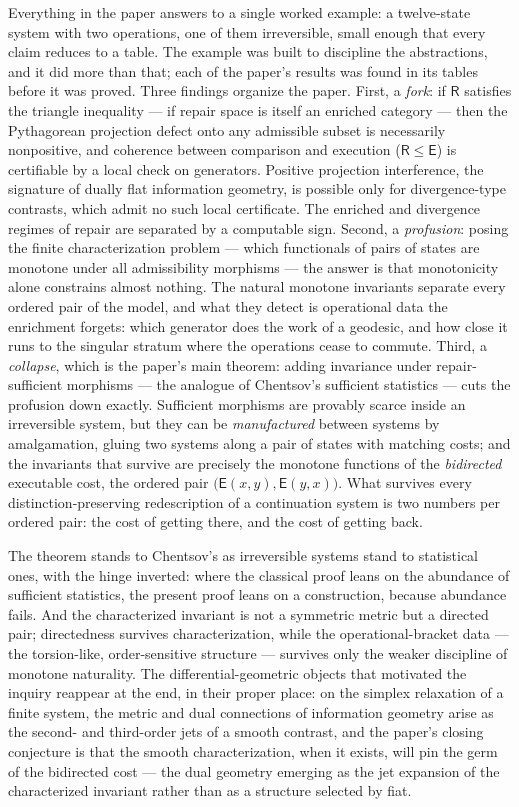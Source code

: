\documentclass[11pt]{article}
\theoremstyle{remark}
\newcommand{\R}{\mathsf{R}}
\newcommand{\E}{\mathsf{E}}
\begin{document}
Everything in the paper answers to a single worked example: a
twelve-state system with two operations, one of them irreversible,
small enough that every claim reduces to a table. The example was
built to discipline the abstractions, and it did more than that; each
of the paper's results was found in its tables before it was proved.
Three findings organize the paper. First, a \emph{fork}: if $\R$
satisfies the triangle inequality --- if repair space is itself an
enriched category --- then the Pythagorean projection defect onto any
admissible subset is necessarily nonpositive, and coherence between
comparison and execution ($\R\le\E$) is certifiable by a local check
on generators. Positive projection interference, the signature of
dually flat information geometry, is possible only for
divergence-type contrasts, which admit no such local certificate.
The enriched and divergence regimes of repair are separated by a
computable sign. Second, a \emph{profusion}: posing the finite
characterization problem --- which functionals of pairs of states are
monotone under all admissibility morphisms --- the answer is that
monotonicity alone constrains almost nothing. The natural monotone
invariants separate every ordered pair of the model, and what they
detect is operational data the enrichment forgets: which generator
does the work of a geodesic, and how close it runs to the singular
stratum where the operations cease to commute. Third, a
\emph{collapse}, which is the paper's main theorem: adding invariance
under repair-sufficient morphisms --- the analogue of Chentsov's
sufficient statistics --- cuts the profusion down exactly. Sufficient
morphisms are provably scarce inside an irreversible system, but they
can be \emph{manufactured} between systems by amalgamation, gluing
two systems along a pair of states with matching costs; and the
invariants that survive are precisely the monotone functions of the
\emph{bidirected} executable cost, the ordered pair
$\bigl(\E(x,y),\E(y,x)\bigr)$. What survives every
distinction-preserving redescription of a continuation system is two
numbers per ordered pair: the cost of getting there, and the cost of
getting back.

The theorem stands to Chentsov's as irreversible systems stand to
statistical ones, with the hinge inverted: where the classical proof
leans on the abundance of sufficient statistics, the present proof
leans on a construction, because abundance fails. And the
characterized invariant is not a symmetric metric but a directed
pair; directedness survives characterization, while the
operational-bracket data --- the torsion-like, order-sensitive
structure --- survives only the weaker discipline of monotone
naturality. The differential-geometric objects that motivated the
inquiry reappear at the end, in their proper place: on the simplex
relaxation of a finite system, the metric and dual connections of
information geometry arise as the second- and third-order jets of a
smooth contrast, and the paper's closing conjecture is that the
smooth characterization, when it exists, will pin the germ of the
bidirected cost --- the dual geometry emerging as the jet expansion
of the characterized invariant rather than as a structure selected by
fiat.
\end{document}
